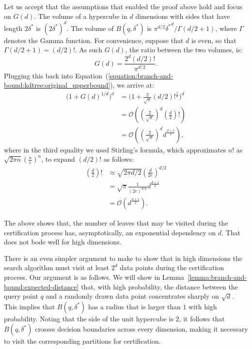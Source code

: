 Let us accept that the assumptions that enabled the proof above hold
and focus on $G(d)$. The volume of a hypercube in $d$ dimensions
with sides that have length $2\delta^\ast$ is $(2\delta^\ast)^d$. The volume of $B(q, \delta^\ast)$
is $\pi^{d/2} {\delta^\ast}^d / \Gamma(d/2 + 1)$, where $\Gamma$ denotes the Gamma function.
For convenience, suppose that $d$ is even,
so that $\Gamma(d/2 + 1) = (d/2)!$. As such $G(d)$, the ratio between the two volumes,
is:
\begin{equation}
    G(d) = \frac{2^d (d/2)!}{\pi^{d/2}}.
\end{equation}
Plugging this back into Equation~(\ref{equation:branch-and-bound:kdtree:original_upperbound}),
we arrive at:
\begin{align*}
    \big( 1 + G(d)^{1/d} \big)^d &= \big( 1 + \frac{2}{\sqrt{\pi}} (d/2)!^{\frac{1}{d}} \big)^d \\
    &= \mathcal{O}((\frac{2}{\sqrt{\pi}})^d (\frac{d}{2})!) \\
    &= \mathcal{O}((\frac{2}{\sqrt{\pi}})^d d^{\frac{d + 1}{2}}),
\end{align*}
where in the third equality we used Stirling's formula,
which approximates $n!$ as $\sqrt{2 \pi n} (\frac{n}{e})^n$, to expand $(d/2)!$
as follows:
\begin{align*}
    (\frac{d}{2})! &\approx \sqrt{2 \pi d/2} (\frac{d}{2e})^{d/2} \\
    &= \sqrt{\pi} \frac{1}{(2e)^{d/2}} d^{\frac{d + 1}{2}} \\
    &= \mathcal{O}(d^\frac{d + 1}{2}).
\end{align*}

\begin{svgraybox}
The above shows that, the number of leaves that may be visited during the certification
process has, asymptotically, an exponential dependency on $d$. That does not bode well
for high dimensions.
\end{svgraybox}

There is an even simpler argument to make to show that in high dimensions the search algorithm
must visit at least $2^d$ data points during the certification process.
Our argument is as follows. We will show in Lemma~\ref{lemma:branch-and-bound:expected-distance}
that, with high probability, the distance between the query point $q$ and a randomly drawn
data point concentrates sharply on $\sqrt{d}$. This implies that $B(q, \delta^\ast)$ has a radius
that is larger than $1$ with high probability. Noting that the side of the unit hypercube is $2$, it follows that
$B(q, \delta^\ast)$ crosses decision boundaries across every dimension, making it necessary to visit
the corresponding partitions for certification.


